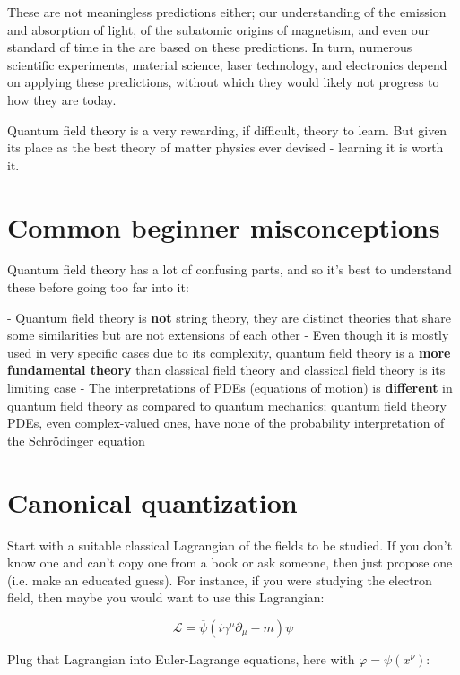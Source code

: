 These are not meaningless predictions either; our understanding of the emission and absorption of light, of the subatomic origins of magnetism, and even our standard of time in the  are based on these predictions. In turn, numerous scientific experiments, material science, laser technology, and electronics depend on applying these predictions, without which they would likely not progress to how they are today.

Quantum field theory is a very rewarding, if difficult, theory to learn. But given its place as the best theory of matter physics ever devised - learning it is worth it.

\section{Common beginner misconceptions}

Quantum field theory has a lot of confusing parts, and so it's best to understand these before going too far into it:

- Quantum field theory is \textbf{not} string theory, they are distinct theories that share some similarities but are not extensions of each other
- Even though it is mostly used in very specific cases due to its complexity, quantum field theory is a \textbf{more fundamental theory} than classical field theory and classical field theory is its limiting case
- The interpretations of PDEs (equations of motion) is \textbf{different} in quantum field theory as compared to quantum mechanics; quantum field theory PDEs, even complex-valued ones, have none of the probability interpretation of the Schrödinger equation

\section{Canonical quantization}

Start with a suitable classical Lagrangian of the fields to be studied. If you don't know one and can't copy one from a book or ask someone, then just propose one (i.e. make an educated guess). For instance, if you were studying the electron field, then maybe you would want to use this Lagrangian:

\begin{equation}
\mathscr{L} = \overline \psi (i \gamma^\mu \partial_\mu - m) \psi
\end{equation}

Plug that Lagrangian into Euler-Lagrange equations, here with $\varphi = \psi(x^\nu)$:

